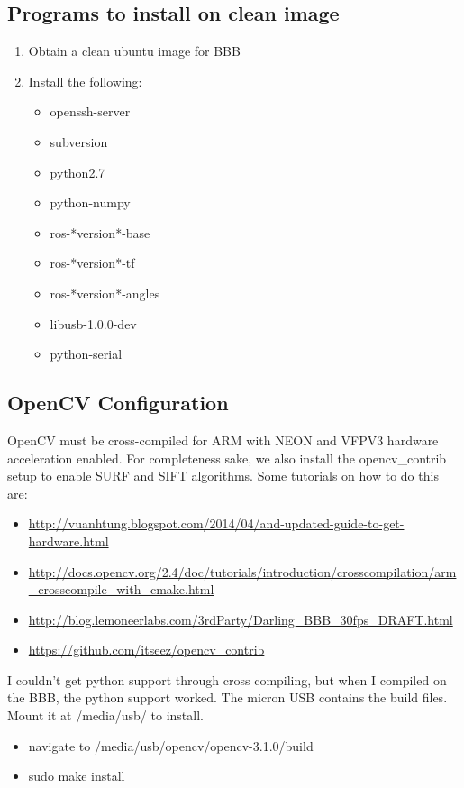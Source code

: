 \documentclass{article}
\begin{document}
\subsection{Programs to install on clean image}
\begin{enumerate}
    \item Obtain a clean ubuntu image for BBB
    \item Install the following: 
        \begin{itemize}
            \item openssh-server
            \item subversion
            \item python2.7
            \item python-numpy
            \item ros-*version*-base
            \item ros-*version*-tf
            \item ros-*version*-angles
            \item libusb-1.0.0-dev
            \item python-serial
        \end{itemize}
\end{enumerate}
\subsection{OpenCV Configuration}
OpenCV must be cross-compiled for ARM with NEON and VFPV3 hardware acceleration enabled. For completeness sake, we also install the opencv\_contrib setup to enable SURF and SIFT algorithms. Some tutorials on how to do this are: 
\begin{itemize}
    \item \url{http://vuanhtung.blogspot.com/2014/04/and-updated-guide-to-get-hardware.html}
    \item \url{http://docs.opencv.org/2.4/doc/tutorials/introduction/crosscompilation/arm_crosscompile_with_cmake.html}
    \item \url{http://blog.lemoneerlabs.com/3rdParty/Darling_BBB_30fps_DRAFT.html}
    \item \url{https://github.com/itseez/opencv_contrib}
\end{itemize}
I couldn't get python support through cross compiling, but when I compiled on the BBB, the python support worked. The micron USB contains the build files. Mount it at /media/usb/ to install. 
\begin{itemize}
    \item navigate to /media/usb/opencv/opencv-3.1.0/build
    \item sudo make install
\end{itemize}
\end{document}
